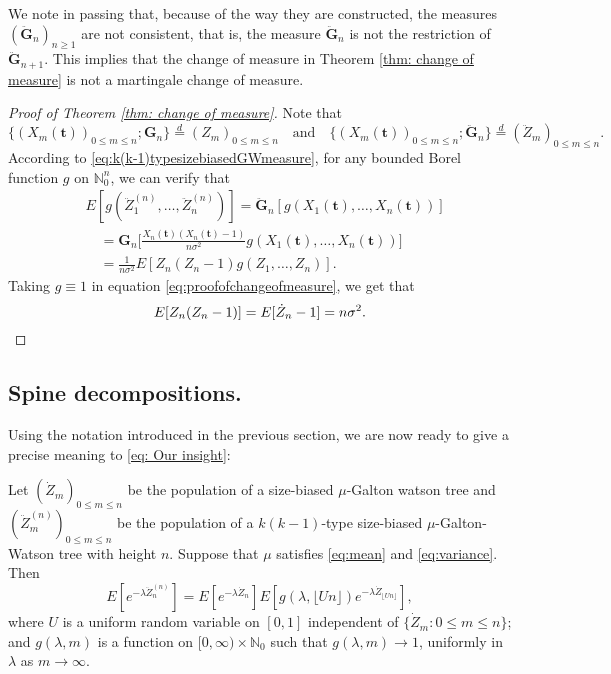 \documentclass[ECP]{ejpecp} %
\begin{document}
We note in passing that, because of the way they are constructed, the measures $(\ddot{\mathbf G}_n)_{n\ge 1}$ are not consistent, that is, the measure $\ddot{\mathbf G}_n$ is not the restriction of $\ddot{\mathbf G}_{n+1}$.
This implies that the change of measure in Theorem \ref{thm: change of measure} is not a martingale change of measure.
\medskip
\begin{proof}[Proof of Theorem \ref{thm: change of measure}]
	Note that
	\[
	\{(X_m( \mathbf t ))_{0\le m\le n}; {\mathbf G}_n\}  \overset{d}{=} (Z_m)_{0\le m\le n}
	\quad    \mbox{and} \quad \{(X_m( \mathbf t ))_{0\le m\le n};\ddot{\mathbf G}_n\}  \overset{d}{=} (\ddot Z_m)_{0\le m\le n}.
	\]
	According to \eqref{eq:k(k-1)typesizebiasedGWmeasure}, for any bounded Borel function $g$ on $\mathbb N_0^n$, we can verify that
	\begin{equation} \label{eq:proofofchangeofmeasure}
	\begin{split}
	&E [ g ( \ddot Z_1^{(n)}, \dots, \ddot Z_n^{(n)})]
	= \ddot{\mathbf G}_n [g ( X_1(  \mathbf t ), \dots, X_n(  \mathbf t ))]
	\\ &\quad = {\mathbf G}_n \big[ \frac { X_n( \mathbf t ) ( X_n( \mathbf t ) - 1)} {n \sigma^2} g (X_1( \mathbf t ), \dots, X_n( \mathbf t ))\big]
	\\&\quad = \frac { 1} { n \sigma^2} E[ Z_n ( Z_n - 1) g( Z_1, \dots, Z_n)].
	\end{split}
	\end{equation}
	Taking $g\equiv 1$ in equation \eqref{eq:proofofchangeofmeasure}, we get that
	\begin{equation}
	\label{eq: second moment}
	E [Z_n(Z_n-1)]= E [\dot Z_n - 1]= n\sigma^2.
	\qedhere
	\end{equation}
\end{proof}

\subsection{Spine decompositions.}
\label{sec:spinesdecomposition}

Using the	notation
introduced in the previous	section, we are now ready to
give a precise meaning to \eqref{eq: Our insight}:
\begin{proposition}\label{prop: size-biased add-on of size-biased tree }
	Let $(\dot Z_m)_{0 \leq m \leq n}$ be the population of a size-biased $\mu$-Galton watson tree and $(\ddot Z^{(n)}_m)_{0 \leq m \leq n}$ be the population of a $k(k-1)$-type size-biased $\mu$-Galton-Watson tree with height $n$.
	Suppose that $\mu$ satisfies \eqref{eq:mean} and \eqref{eq:variance}.
	Then
	\[
	E [ e^{- \lambda \ddot Z_n^{(n)}} ]
	= E [e^{-\lambda \dot Z_n}] E[g(\lambda, \lfloor Un \rfloor )e^{-\lambda \dot Z_{ \lfloor Un \rfloor}}],
	\]
	where $U$ is a uniform random variable on $[0,1]$ independent of $\{\dot Z_m: 0\le m\le n\}$;
	and $g(\lambda, m)$ is a function on $[0,\infty) \times \mathbb N_0$ such that
	$g(\lambda, m) \to 1$, uniformly in $\lambda$ as $m\to \infty$.
\end{proposition}
\end{document}
